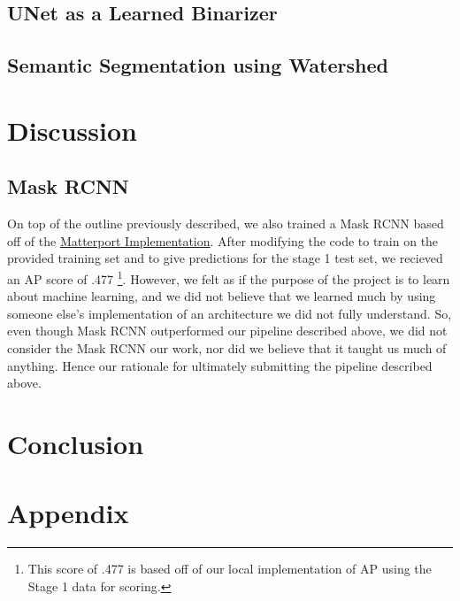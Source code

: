 \documentclass[paper=letter, fontsize=12pt]{article}
\newcommand\includeappendices{%
  \appendix
  \renewcommand{\thesection}{\Alph{section}}
  \section{Appendix}
  \the\mainnotetoks}
\numberwithin{equation}{section} %
\numberwithin{figure}{section} %
\numberwithin{table}{section} %
\begin{document}
\subsection{UNet as a Learned Binarizer}

\subsection{Semantic Segmentation using Watershed}

\section{Discussion}

\subsection{Mask RCNN}

On top of the outline previously described, we also trained a Mask RCNN based
off of the \newline\href{https://github.com/matterport/Mask\_RCNN}{Matterport
Implementation}.  After modifying the
code to train on the provided training set and to give predictions for the
stage 1 test set, we recieved an AP score of .477 \footnote{This score of .477
is based off of our local implementation of AP using the Stage 1 data for
scoring.}. However, we felt as if the purpose of the project is to learn about
machine learning, and we did not believe that we learned much by using someone
else's implementation of an architecture we did not fully understand.  So, even
though Mask RCNN outperformed our pipeline described above, we did not consider
the Mask RCNN our work, nor did we believe that it taught us much of anything.
Hence our rationale for ultimately submitting the pipeline described above.


\section{Conclusion}

\newpage

\printbibliography

\newpage

\includeappendices
\end{document}
